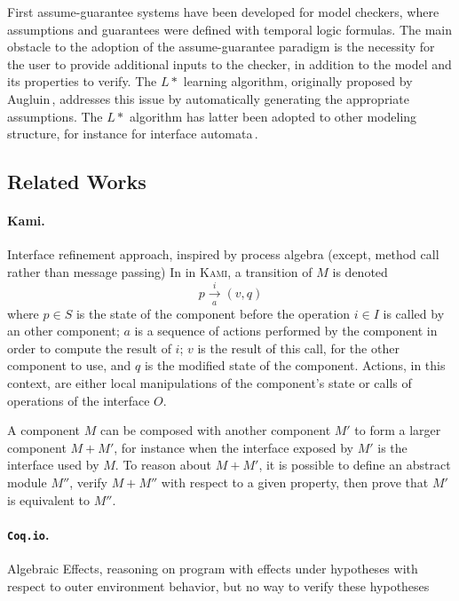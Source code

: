 First assume-guarantee systems have been developed for model checkers, where
assumptions and guarantees were defined with temporal logic formulas.
%
The main obstacle to the adoption of the assume-guarantee paradigm is the
necessity for the user to provide additional inputs to the checker, in addition
to the model and its properties to verify.
%
The \( L* \) learning algorithm, originally proposed by
Augluin\,\cite{angluin1987lstart}, addresses this issue by automatically
generating the appropriate assumptions.
%
The \( L* \) algorithm has latter been adopted to other modeling structure, for
instance for interface automata\,\cite{emmi2008assume}.

\subsection{Related Works}

\paragraph{Kami.}
%
Interface refinement approach, inspired by process algebra (except, method call
rather than message passing)
%
In in {\scshape Kami}, a transition of $M$ is denoted
%
\[ p \xrightarrow[a]{i} (v, q) \]
%
where $p \in S$ is the state of the component before the operation $i \in I$ is
called by an other component;
%
$a$ is a sequence of actions performed by the component in order to compute the
result of $i$;
%
$v$ is the result of this call, for the other component to use, and $q$ is the
modified state of the component.
%
Actions, in this context, are either local manipulations of the component's
state or calls of operations of the interface $O$.

A component $M$ can be composed with another component $M'$ to form a larger
component $M + M'$, for instance when the interface exposed by $M'$ is the
interface used by $M$.
%
To reason about $M + M'$, it is possible to define an abstract module $M''$,
verify $M + M''$ with respect to a given property, then prove that $M'$ is
equivalent to $M''$.

\paragraph{\texttt{Coq.io}.}
%
Algebraic Effects, reasoning on program with effects under hypotheses with
respect to outer environment behavior, but no way to verify these hypotheses

